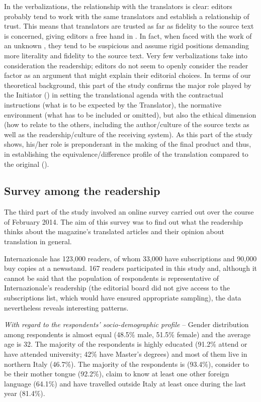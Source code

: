 \documentclass[output=paper]{LSP/langsci}
\begin{document}
In the verbalizations, the relationship with the translators is clear: editors probably tend to work with the same translators and establish a relationship of trust. This means that translators are trusted as far as fidelity to the source text is concerned, giving editors a free hand in . In fact, when faced with the work of an unknown , they tend to be suspicious and assume rigid positions demanding more literality and fidelity to the source text. Very few verbalizations take into consideration the readership; editors do not seem to openly consider the reader factor as an argument that might explain their editorial %
%
choices. In terms of our theoretical background, this part of the study confirms the major role played by the Initiator () in setting the translational agenda with the contractual instructions (what is to be expected by the Translator), the normative environment (what has to be included or omitted), but also the ethical dimension (how to relate to the others, including the author/culture of the source texts as well as the readership/culture of the receiving system). As this part of the study shows, his/her role is preponderant in the making of the final product and thus, in establishing the equivalence/difference profile of the translation compared to the original ().

\subsection{Survey among the readership}\label{troqe-marchan:sec:c}

The third part of the study involved an online survey carried out over the course of February 2014. The aim of this survey was to find out what the readership thinks about the magazine's translated articles and their opinion about translation in general. 

Internazionale has 123,000 readers, of whom 33,000 have subscriptions and 90,000 buy copies at a newsstand. 167 readers participated in this study and, although it cannot be said that the population of respondents is representative of Internazionale's readership (the editorial board did not give access to the subscriptions list, which would have ensured appropriate sampling), the data nevertheless reveals interesting patterns. 

\textit{With regard to} \textit{the respondents' socio-demographic profile} -- Gender distribution among respondents is almost equal (48.5\% male, 51.5\% female) and the average age is 32. The majority of the respondents is highly educated (91.2\% attend or have attended university; 42\% have Master's degrees) and most of them live in northern Italy (46.7\%). The majority of the respondents is  (93.4\%), consider  to be their mother tongue (92.2\%), claim to know at least one other foreign language (64.1\%) and have travelled outside Italy at least once during  the last year (81.4\%). 
\end{document}
